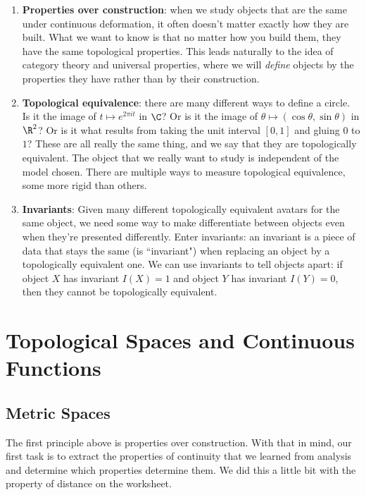 \documentclass[noname]{notes}
\begin{document}
\begin{enumerate}[(1)]
	\item \textbf{Properties over construction}: when we study objects that are the same under continuous deformation, it often doesn't matter exactly how they are built. What we want to know is that no matter how you build them, they have the same topological properties. This leads naturally to the idea of category theory and universal properties, where we will \emph{define} objects by the properties they have rather than by their construction. 
	\item \textbf{Topological equivalence}: there are many different ways to define a circle. Is it the image of $t \mapsto e^{2 \pi i t}$ in $\C$? Or is it the image of $\theta \mapsto (\cos\theta, \sin \theta)$ in $\R^2$? Or is it what results from taking the unit interval $[0,1]$ and gluing $0$ to $1$? These are all really the same thing, and we say that they are topologically equivalent. The object that we really want to study is independent of the model chosen. There are multiple ways to measure topological equivalence, some more rigid than others. 
	\item \textbf{Invariants}: Given many different topologically equivalent avatars for the same object, we need some way to make differentiate between objects even when they're presented differently. Enter invariants: an invariant is a piece of data that stays the same (is ``invariant") when replacing an object by a topologically equivalent one. We can use invariants to tell objects apart: if object $X$ has invariant $I(X) = 1$ and object $Y$ has invariant $I(Y) = 0$, then they cannot be topologically equivalent. 
\end{enumerate}


\chapter{Topological Spaces and Continuous Functions}

\section{Metric Spaces} 

The first principle above is properties over construction. With that in mind, our first task is to extract the properties of continuity that we learned from analysis and determine which properties determine them. We did this a little bit with the property of distance on the worksheet. 
\end{document}
